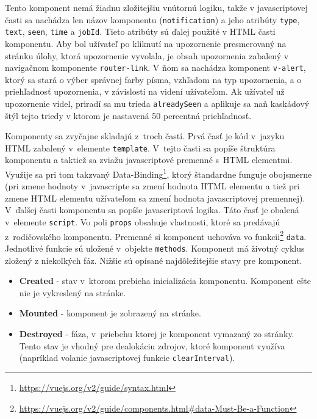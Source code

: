 \documentclass[slovak]{fitthesis}
\begin{document}
Tento komponent nemá žiadnu zložitejšiu vnútornú logiku, takže v javascriptovej časti sa nachádza len názov komponentu (\texttt{notification}) a jeho atribúty \texttt{type}, \texttt{text}, \texttt{seen}, \texttt{time} a \texttt{jobId}. Tieto atribúty sú ďalej použité v HTML časti komponentu. Aby bol užívateľ po kliknutí na upozornenie presmerovaný na stránku úlohy, ktorá upozornenie vyvolala, je obsah upozornenia zabalený v navigačnom komponente \texttt{router-link}. V ňom sa nachádza komponent \texttt{v-alert}, ktorý sa stará o výber správnej farby písma, vzhľadom na typ upozornenia, a o priehľadnosť upozornenia, v závislosti na videní užívateľom. Ak užívateľ už upozornenie videl, priradí sa mu trieda \texttt{alreadySeen} a aplikuje sa naň kaskádový štýl tejto triedy v ktorom je nastavená 50 percentná priehľadnosť.



\noindent
Komponenty sa zvyčajne skladajú z~troch častí. Prvá časť je kód v~jazyku HTML zabalený v~elemente \texttt{template}. V~tejto časti sa popíše štruktúra komponentu a taktiež sa zviažu javascriptové premenné s~HTML elementmi. Využije sa pri tom takzvaný Data-Binding\footnote{\url{https://vuejs.org/v2/guide/syntax.html}}, ktorý štandardne funguje obojsmerne (pri zmene hodnoty v~javascripte sa zmení hodnota HTML elementu a tiež pri zmene HTML elementu užívateľom sa zmení hodnota javascriptovej premennej). V~ďalšej časti komponentu sa popíše javascriptová logika. Táto časť je obalená v~elemente \texttt{script}. Vo poli \texttt{props} obsahuje vlastnosti, ktoré sa predávajú z~rodičovského komponentu. Premenné si komponent uchováva vo funkcii\footnote{\url{https://vuejs.org/v2/guide/components.html\#data-Must-Be-a-Function}} \texttt{data}. Jednotlivé funkcie sú uložené v~objekte \texttt{methods}. Komponent má životný cyklus zložený z niekoľkých fáz. Nižšie sú opísané najdôležitejšie stavy pre komponent.
\begin{itemize}
    \item \textbf{Created} - stav v~ktorom prebieha inicializácia komponentu. Komponent ešte nie je vykreslený na stránke.
    \item \textbf{Mounted} - komponent je zobrazený na stránke.
    \item \textbf{Destroyed} - fáza, v~priebehu ktorej je komponent vymazaný zo stránky. Tento stav je vhodný pre dealokáciu zdrojov, ktoré komponent využíva (napríklad volanie javascriptovej funkcie \texttt{clearInterval}).
\end{itemize}
\end{document}
